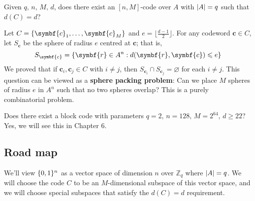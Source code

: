 Given $ q,\,n,\,M,\,d $, does there exist an $ [n,M] $-code over $ A $
with $ \lvert A\rvert=q $ such that $ d(C)=d $?

Let $ C=\set{\symbf{c}_1,\ldots ,\symbf{c}_M} $ and $ e=\lfloor \frac{d-1}{2} \rfloor $.
For any codeword $ \symbf{c}\in C $, let $ S_{\symbf{c}} $ be the sphere of radius $ e $ centred at
$ \symbf{c} $;
that is,
\[ S_{\symbf{c}}= \set{\symbf{r}\in A^n:d(\symbf{r},\symbf{c})\leqslant e} \]
We proved that if $ \symbf{c}_i,\symbf{c}_j\in C $ with $ i\neq j $,
then $ S_{\symbf{c}_i}\cap S_{\symbf{c}_j}= \varnothing $ for each $ i\neq j $.
This question can be viewed as a \textbf{sphere packing problem}:
Can we place $ M $ spheres of radius $ e $ in $ A^n $ such that
no two spheres overlap? This is a purely combinatorial problem.

Does there exist a block code with parameters
$ q=2,\,n=128,\,M=2^{64},\,d\geqslant 22 $? Yes, we will see this in Chapter 6.

\subsection*{Road map}
We'll view $ \{0,1\}^{n} $ as a vector space of
dimension $ n $ over $ \mathbb{Z}_q $ where $ \lvert A\rvert=q $. We will choose the code
$ C $ to be an $ M $-dimensional subspace of this vector space,
and we will choose special subspaces that satisfy the $ d(C)=d $ requirement.
